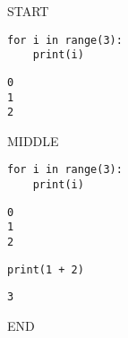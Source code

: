START

\begin{verbatim}
for i in range(3):
    print(i)
\end{verbatim}
\begin{verbatim}
0
1
2
\end{verbatim}

MIDDLE

\begin{verbatim}
for i in range(3):
    print(i)
\end{verbatim}
\begin{verbatim}
0
1
2
\end{verbatim}

\begin{verbatim}
print(1 + 2)
\end{verbatim}
\begin{verbatim}
3
\end{verbatim}

END
